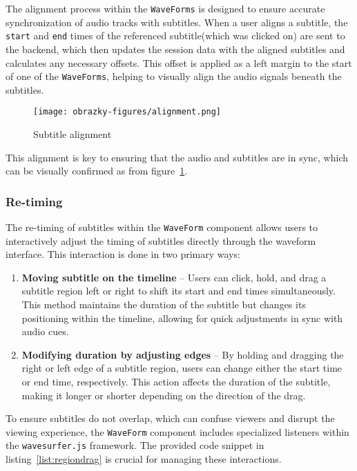 The alignment process within the \texttt{WaveForms} is designed to ensure accurate synchronization of audio tracks with subtitles. When a user aligns a subtitle, the \texttt{start} and \texttt{end} times of the referenced subtitle(which was clicked on) are sent to the backend, which then updates the session data with the aligned subtitles and calculates any necessary offsets. This offset is applied as a left margin to the start of one of the \texttt{WaveForms}, helping to visually align the audio signals beneath the subtitles.

\begin{figure}[ht]
  \centering
  \texttt{[image: obrazky-figures/alignment.png]}
  \caption{Subtitle alignment}
  \label{fig:alignment}
\end{figure}

This alignment is key to ensuring that the audio and subtitles are in sync, which can be visually confirmed as from figure~\ref{fig:alignment}.

\subsubsection{Re-timing}
\label{implement:wf:timing}

The re-timing of subtitles within the \texttt{WaveForm} component allows users to interactively adjust the timing of subtitles directly through the waveform interface. This interaction is done in two primary ways:
\begin{enumerate}
    \item \textbf{Moving subtitle on the timeline} -- Users can click, hold, and drag a subtitle region left or right to shift its start and end times simultaneously. This method maintains the duration of the subtitle but changes its positioning within the timeline, allowing for quick adjustments in sync with audio cues.
    \item \textbf{Modifying duration by adjusting edges} -- By holding and dragging the right or left edge of a subtitle region, users can change either the start time or end time, respectively. This action affects the duration of the subtitle, making it longer or shorter depending on the direction of the drag.
\end{enumerate}
To ensure subtitles do not overlap, which can confuse viewers and disrupt the viewing experience, the \texttt{WaveForm} component includes specialized listeners within the \texttt{wavesurfer.js} framework. The provided code snippet in listing~\ref{list:regiondrag} is crucial for managing these interactions.

